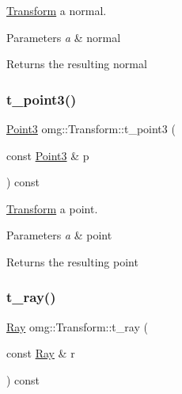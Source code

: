 \mbox{\hyperlink{classomg_1_1_transform}{Transform}} a normal. 


\begin{DoxyParams}{Parameters}
{\em a} & normal \\
\hline
\end{DoxyParams}
\begin{DoxyReturn}{Returns}
the resulting normal 
\end{DoxyReturn}
\mbox{\label{classomg_1_1_transform_a79a0ead7866a67287ce3b26ad318ef51}} 
\subsubsection{\texorpdfstring{t\_point3()}{t\_point3()}}
{\footnotesize\ttfamily \mbox{\hyperlink{namespaceomg_af85242d35fdacf829d32a6f9b95f3e35}{Point3}} omg\+::\+Transform\+::t\+\_\+point3 (\begin{DoxyParamCaption}\item[{const \mbox{\hyperlink{namespaceomg_af85242d35fdacf829d32a6f9b95f3e35}{Point3}} \&}]{p }\end{DoxyParamCaption}) const\hspace{0.3cm}{\ttfamily [inline]}}



\mbox{\hyperlink{classomg_1_1_transform}{Transform}} a point. 


\begin{DoxyParams}{Parameters}
{\em a} & point \\
\hline
\end{DoxyParams}
\begin{DoxyReturn}{Returns}
the resulting point 
\end{DoxyReturn}
\mbox{\label{classomg_1_1_transform_ac96fd6a112b9ab99335a7b84b86f7dc2}} 
\subsubsection{\texorpdfstring{t\_ray()}{t\_ray()}}
{\footnotesize\ttfamily \mbox{\hyperlink{classomg_1_1_ray}{Ray}} omg\+::\+Transform\+::t\+\_\+ray (\begin{DoxyParamCaption}\item[{const \mbox{\hyperlink{classomg_1_1_ray}{Ray}} \&}]{r }\end{DoxyParamCaption}) const\hspace{0.3cm}{\ttfamily [inline]}}



